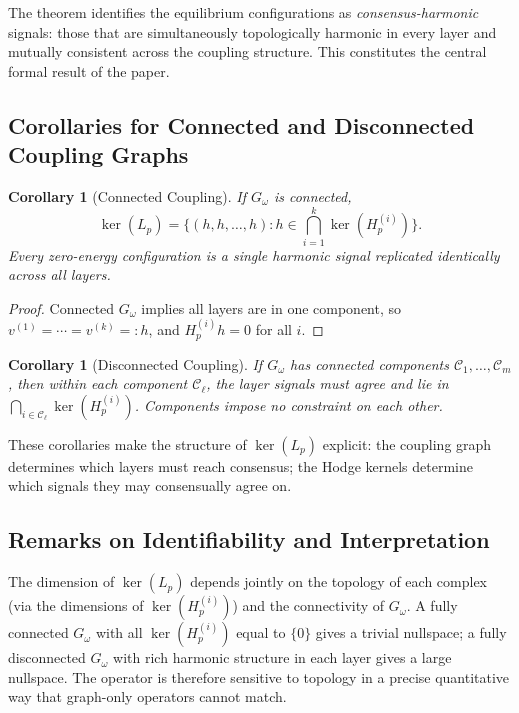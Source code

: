 \documentclass[11pt]{article}
\newtheorem{corollary}[theorem]{Corollary}
\theoremstyle{definition}
\theoremstyle{remark}
\newcommand{\Gom}{G_\omega}
\begin{document}
The theorem identifies the equilibrium configurations as \emph{consensus-harmonic} signals: those that are simultaneously topologically harmonic in every layer and mutually consistent across the coupling structure. This constitutes the central formal result of the paper.

\subsection{Corollaries for Connected and Disconnected Coupling Graphs}

\begin{corollary}[Connected Coupling]
\label{cor:connected}
If $\Gom$ is connected,
\[
  \ker(L_p) = \bigl\{(h,h,\dots,h) : h\in\textstyle\bigcap_{i=1}^k\ker(H_p^{(i)})\bigr\}.
\]
Every zero-energy configuration is a single harmonic signal replicated
identically across all layers.
\end{corollary}

\begin{proof}
Connected $\Gom$ implies all layers are in one component, so $v^{(1)}=\cdots=
v^{(k)}=:h$, and $H_p^{(i)}h=0$ for all $i$.
\end{proof}

\begin{corollary}[Disconnected Coupling]
\label{cor:disconnected}
If $\Gom$ has connected components $\mathcal{C}_1,\dots,\mathcal{C}_m$, then
within each component $\mathcal{C}_\ell$, the layer signals must agree and lie
in $\bigcap_{i\in\mathcal{C}_\ell}\ker(H_p^{(i)})$. Components impose no
constraint on each other.
\end{corollary}

These corollaries make the structure of $\ker(L_p)$ explicit: the coupling graph
determines which layers must reach consensus; the Hodge kernels determine which
signals they may consensually agree on.

\subsection{Remarks on Identifiability and Interpretation}

The dimension of $\ker(L_p)$ depends jointly on the topology of each complex
(via the dimensions of $\ker(H_p^{(i)})$) and the connectivity of $\Gom$. A
fully connected $\Gom$ with all $\ker(H_p^{(i)})$ equal to $\{0\}$ gives a
trivial nullspace; a fully disconnected $\Gom$ with rich harmonic structure in
each layer gives a large nullspace. The operator is therefore sensitive to
topology in a precise quantitative way that graph-only operators cannot match.
\end{document}
